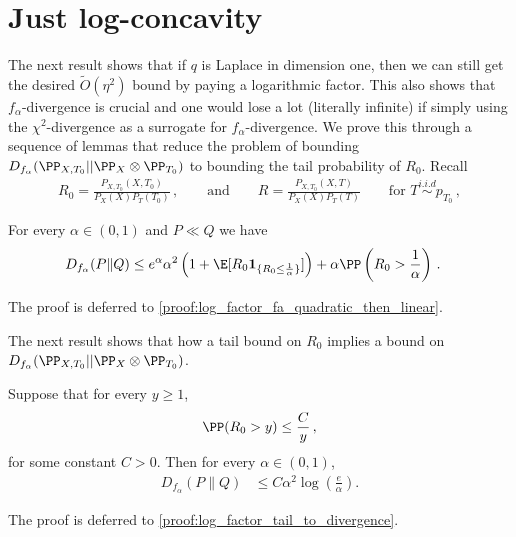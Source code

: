 \section{Just log-concavity}
\label{sec:log_factor_reduction_to_tail}
The next result shows that if $q$ is Laplace in dimension one, then we can still get the desired $\tilde{O}(\eta^2)$ bound by paying a logarithmic factor.
This also shows that $f_\alpha$-divergence is crucial and one would lose a lot (literally infinite)
if simply using the $\chi^2$-divergence as a surrogate for $f_\alpha$-divergence.
We prove this through a sequence of lemmas that reduce the problem of bounding $D_{f_\alpha}(\PP_{X, T_0} || \PP_X \otimes \PP_{T_0})$ to bounding the tail probability of $R_0$.
Recall
\begin{align}
    R_0=\frac{P_{X,T_0}(X, T_0)}{P_X(X)P_{T}(T_0)}\,, \qquad
    \text{and}\qquad
    R=\frac{P_{X,T_0}(X, T)}{P_X(X)P_T(T)} \qquad \text{for } T \stackrel{i.i.d}{\sim} p_{T_0}\,,
\end{align}

\begin{lemma}
    \label{lem:log_factor_fa_quadratic_then_linear}
    For every $\alpha\in(0,1)$ and $P\ll Q$ we have
    \begin{align}
        D_{f_\alpha}(P\|Q)
         & \le
        e^{\alpha}
        \alpha^2
        \left(
        1+\E[R_0\mathbf{1}_{\{R_0\le \frac{1}{\alpha}\}}]
        \right)
        +
        \alpha \PP\left(R_0>\frac{1}{\alpha}\right)\,.
        \label{eq:log_factor_reduction_to_tail}
    \end{align}
\end{lemma}
The proof is deferred to \cref{proof:log_factor_fa_quadratic_then_linear}.

The next result shows that how a tail bound on $R_0$ implies a bound on $D_{f_\alpha}(\PP_{X, T_0} || \PP_X \otimes \PP_{T_0})$.
\begin{lemma}
    \label{lem:log_factor_tail_to_divergence}
    Suppose that for every $y\ge1$,
    \begin{align}
        \PP(R_0>y)
        \le
        \frac{C}{y}\,,
        \label{eq:log_factor_R0_tail}
    \end{align}
    for some constant $C>0$.
    Then for every $\alpha\in(0,1)$,
    \begin{align}
        D_{f_\alpha}(P\|Q)
         & \le
        C \alpha^2\log\left(\frac{e}{\alpha}\right).
        \label{eq:log_factor_fa_upper}
    \end{align}
\end{lemma}
The proof is deferred to \cref{proof:log_factor_tail_to_divergence}.

